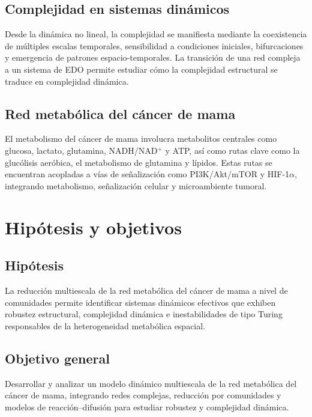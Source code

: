 \documentclass[12pt,spanish]{article}
\begin{document}
	\subsection{Complejidad en sistemas dinámicos}
	
	Desde la dinámica no lineal, la complejidad se manifiesta mediante la coexistencia de múltiples escalas temporales, sensibilidad a condiciones iniciales, bifurcaciones y emergencia de patrones espacio-temporales. La transición de una red compleja a un sistema de EDO permite estudiar cómo la complejidad estructural se traduce en complejidad dinámica.
	
	\subsection{Red metabólica del cáncer de mama}
	
	El metabolismo del cáncer de mama involucra metabolitos centrales como glucosa, lactato, glutamina, NADH/NAD$^+$ y ATP, así como rutas clave como la glucólisis aeróbica, el metabolismo de glutamina y lípidos. Estas rutas se encuentran acopladas a vías de señalización como PI3K/Akt/mTOR y HIF-1$\alpha$, integrando metabolismo, señalización celular y microambiente tumoral.
	
	\section{Hipótesis y objetivos}
	
	\subsection{Hipótesis}
	
	La reducción multiescala de la red metabólica del cáncer de mama a nivel de comunidades permite identificar sistemas dinámicos efectivos que exhiben robustez estructural, complejidad dinámica e inestabilidades de tipo Turing responsables de la heterogeneidad metabólica espacial.
	
	\subsection{Objetivo general}
	
	Desarrollar y analizar un modelo dinámico multiescala de la red metabólica del cáncer de mama, integrando redes complejas, reducción por comunidades y modelos de reacción--difusión para estudiar robustez y complejidad dinámica.
	
\end{document}
